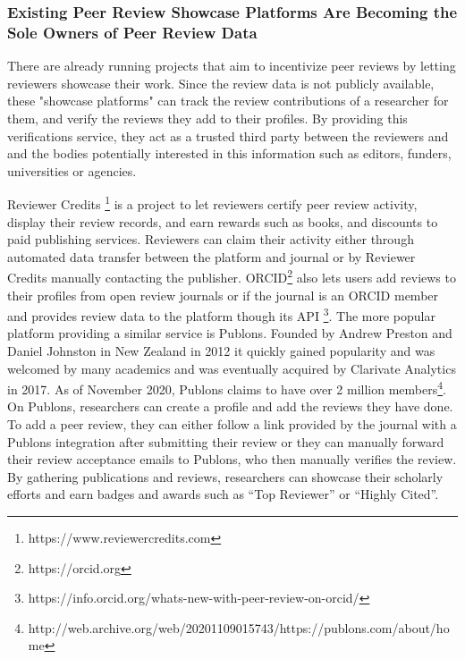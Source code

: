 \subsubsection{Existing Peer Review Showcase Platforms Are Becoming the Sole Owners of Peer Review Data}

There are already running projects that aim to incentivize peer reviews by letting reviewers showcase their work. Since the review data is not publicly available, these "showcase platforms" can track the review contributions of a researcher for them, and verify the reviews they add to their profiles. By providing this verifications service, they act as a trusted third party between the reviewers and  and the bodies potentially interested in this information such as editors, funders, universities or agencies.

Reviewer Credits \footnote{https://www.reviewercredits.com}  is a project to let reviewers certify peer review activity, display their review records, and earn rewards such as books, and discounts to paid publishing services. Reviewers can claim their activity either through automated data transfer between the platform and journal or by Reviewer Credits manually contacting the publisher. \acrshort{ORCID}\footnote{https://orcid.org} also lets users add reviews to their profiles from open review journals or if the journal is an \acrshort{ORCID} member and provides review data to the platform though its \acrshort{API} \footnote{https://info.orcid.org/whats-new-with-peer-review-on-orcid/}. The more popular platform providing a similar service is Publons. Founded by Andrew Preston and Daniel Johnston in New Zealand in 2012 it quickly gained popularity and was welcomed by many academics \parencite[266]{Smith.2015} and was eventually acquired by Clarivate Analytics in 2017. As of November 2020, Publons claims to have over 2 million members\footnote{http://web.archive.org/web/20201109015743/https://publons.com/about/home}. On Publons, researchers can create a profile and add the reviews they have done. To add a peer review, they can either follow a link provided by the journal with a Publons integration after submitting their review or they can manually forward their review acceptance emails to Publons, who then manually verifies the review. By gathering publications and reviews, researchers can showcase their scholarly efforts and earn badges and awards such as “Top Reviewer” or “Highly Cited”. 

